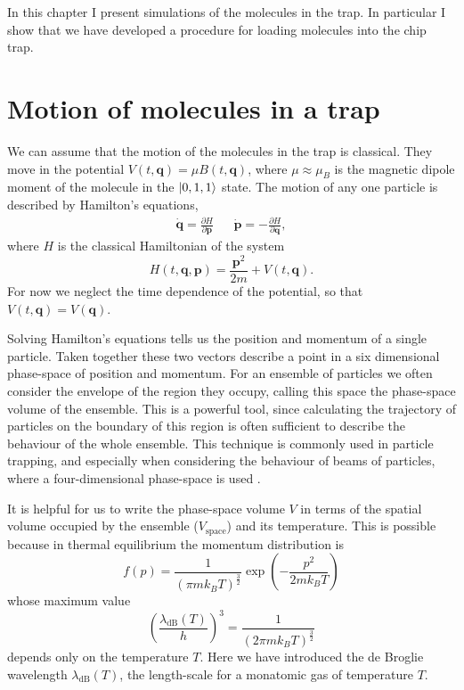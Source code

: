 In this chapter I present simulations of the molecules in the trap. In
particular I show that we have developed a procedure for loading molecules into
the chip trap.

\section{Motion of molecules in a trap}
\label{sim:motion}

We can assume that the motion of the molecules in the trap is classical. They
move in the potential $V(t, \mathbf{q}) = \mu B(t, \mathbf{q})$, where
$\mu\approx\mu_B$ is the magnetic dipole moment of the molecule in the
$\ket{0,1,1}$ state.  The motion of any one particle is described by Hamilton's
equations,~\cite{Lichtenberg1969}
%
\begin{align}
  \label{sim:eq:hamilton}
  \dot{\mathbf{q}} =  \frac{\partial H}{\partial \mathbf{p}} &&
  \dot{\mathbf{p}} = -\frac{\partial H}{\partial \mathbf{q}},
\end{align}
%
where $H$ is the classical Hamiltonian of the system
\begin{equation}
  H(t, \mathbf{q}, \mathbf{p}) = \frac{\mathbf{p}^2}{2m} + V(t, \mathbf{q}).
\end{equation}
For now we neglect the time dependence of the potential, so that $V(t,
\mathbf{q}) = V(\mathbf{q})$.

Solving Hamilton's equations tells us the position and momentum of a single
particle. Taken together these two vectors describe a point in a six
dimensional phase-space of position and momentum.
%
For an ensemble of particles we often consider the envelope of the region they
occupy, calling this space the phase-space volume of the ensemble. This is a
powerful tool, since calculating the trajectory of particles on the boundary of
this region is often sufficient to describe the behaviour of the whole
ensemble. This technique is commonly used in particle trapping, and especially
when considering the behaviour of beams of particles, where a four-dimensional
phase-space is used \cite{Hand1998, Lichtenberg1969}.

It is helpful for us to write the phase-space volume $V$ in terms of the
spatial volume occupied by the ensemble ($V_\text{space}$) and its temperature.
This is possible because in thermal equilibrium the momentum distribution is 
%
\begin{equation}
  f(p) = \frac{1}{(\pi m k_B T)^\frac{3}{2}}\exp(-\frac{p^2}{2 m k_B T})
\end{equation}
%
whose maximum value
%
\begin{equation}
  \left(\frac{\lambda_\text{dB}(T)}{h}\right)^3 = \frac{1}{(2 \pi m k_B
  T)^\frac{3}{2}}
\end{equation}
%
depends only on the temperature $T$. Here we have introduced the de Broglie
wavelength $\lambda_\text{dB}(T)$, the length-scale for a monatomic gas of
temperature $T$.~\cite{blundell2}

